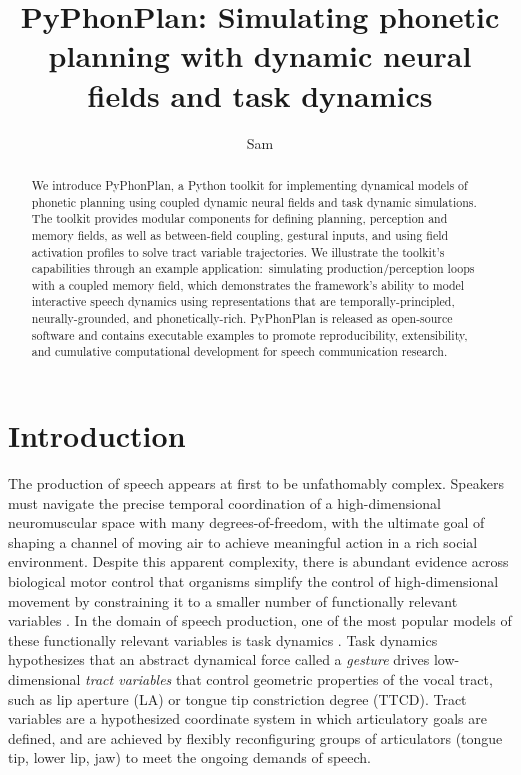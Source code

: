 \documentclass[cameraready]{Interspeech}
\title{PyPhonPlan: Simulating phonetic planning with dynamic neural fields and task dynamics}
\author[orcid=0000-0003-4469-1512]{Sam}{Kirkham}
\begin{document}
\maketitle

\begin{abstract}
    We introduce PyPhonPlan, a Python toolkit for implementing dynamical models of phonetic planning using coupled dynamic neural fields and task dynamic simulations. The toolkit provides modular components for defining planning, perception and memory fields, as well as between-field coupling, gestural inputs, and using field activation profiles to solve tract variable trajectories. We illustrate the toolkit's capabilities through an example application:~simulating production/perception loops with a coupled memory field, which demonstrates the framework's ability to model interactive speech dynamics using representations that are temporally-principled, neurally-grounded, and phonetically-rich. PyPhonPlan is released as open-source software and contains executable examples to promote reproducibility, extensibility, and cumulative computational development for speech communication research.
\end{abstract}




\section{Introduction}

The production of speech appears at first to be unfathomably complex. Speakers must navigate the precise temporal coordination of a high-dimensional neuromuscular space with many degrees-of-freedom, with the ultimate goal of shaping a channel of moving air to achieve meaningful action in a rich social environment. Despite this apparent complexity, there is abundant evidence across biological motor control that organisms simplify the control of high-dimensional movement by constraining it to a smaller number of functionally relevant variables \cite{bernstein1967, haken-etal1985}. In the domain of speech production, one of the most popular models of these functionally relevant variables is task dynamics \cite{fowler1980, kelso-etal1986, saltzman-munhall1989, browman-goldstein1992, byrd-saltzman1998, iskarous2017}. Task dynamics hypothesizes that an abstract dynamical force called a \textit{gesture} drives low-dimensional \textit{tract variables} that control geometric properties of the vocal tract, such as lip aperture (LA) or tongue tip constriction degree (TTCD). Tract variables are a hypothesized coordinate system in which articulatory goals are defined, and are achieved by flexibly reconfiguring groups of articulators (tongue tip, lower lip, jaw) to meet the ongoing demands of speech.
\end{document}
